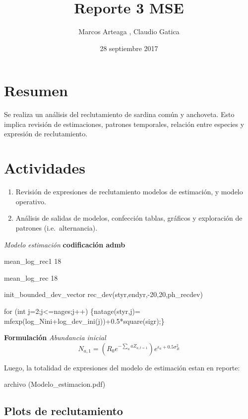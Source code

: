 \documentclass[]{article}
\title{Reporte 3 MSE}
\author{Marcos Arteaga , Claudio Gatica}
\date{28 septiembre 2017}
\begin{document}
\maketitle

\section{Resumen}\label{resumen}

Se realiza un análisis del reclutamiento de sardina común y anchoveta.
Esto implica revisión de estimaciones, patrones temporales, relación
entre especies y expresión de reclutamiento.

\section{Actividades}\label{actividades}

\begin{enumerate}
\def\labelenumi{\arabic{enumi}.}
\item
  Revisión de expresiones de reclutamiento modelos de estimación, y
  modelo operativo.
\item
  Análisis de salidas de modelos, confección tablas, gráficos y
  exploración de patrones (i.e.~alternancia).
\end{enumerate}

\emph{Modelo estimación} \textbf{codificación admb}

mean\_log\_rec1 18

mean\_log\_rec 18

init\_bounded\_dev\_vector rec\_dev(styr,endyr,-20,20,ph\_recdev)

for (int j=2;j\textless{}=nages;j++) \{natage(styr,j)=
mfexp(log\_Nini+log\_dev\_ini(j))+0.5*square(sigr);\}

\textbf{Formulación} \emph{Abundancia inicial} \[
N_{a,1}=\left(R_{0}e^{-\sum_{a} aZ_{a,t=1}}\right)e^{\epsilon_a+0.5\sigma^2_R} 
\]

Luego, la totalidad de expresiones del modelo de estimación estan en
reporte:

archivo (Modelo\_estimacion.pdf)

\subsection{Plots de reclutamiento}\label{plots-de-reclutamiento}
\end{document}
